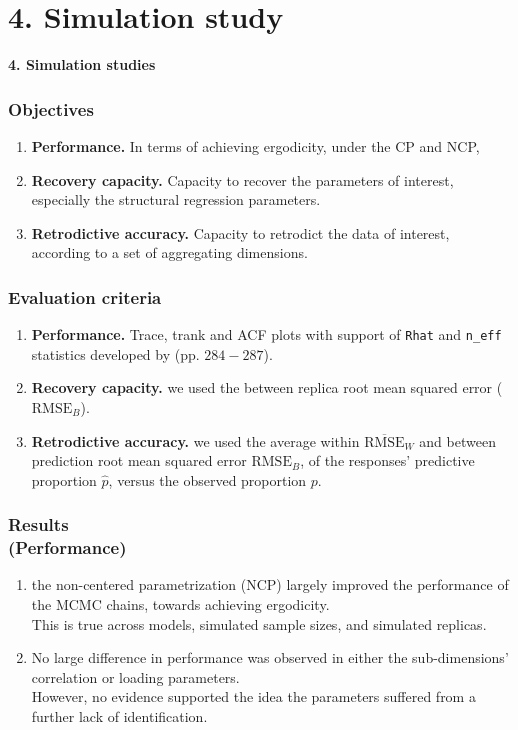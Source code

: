 \documentclass[arial,12pt,xcolor=dvipsnames]{beamer}
\begin{document}
\section{4. Simulation study}
%
\begin{frame}
	\textbf{4. Simulation studies}
\end{frame}
%
\begin{frame}
	\frametitle{Objectives}
	\begin{enumerate}
		\item \textbf{Performance.} In terms of achieving ergodicity, under the CP and NCP, 
		\item \textbf{Recovery capacity.} Capacity to recover the parameters of interest, especially the structural regression parameters.
		\item \textbf{Retrodictive accuracy.} Capacity to retrodict the data of interest, according to a set of aggregating dimensions.
	\end{enumerate} 
\end{frame}
%
\begin{frame}
	\frametitle{Evaluation criteria}
	\begin{enumerate}
		\item \textbf{Performance.} Trace, trank and ACF plots with support of \texttt{Rhat} and \texttt{n\_eff} statistics developed by \citet{Gelman_et_al_2014} (pp. $284-287$).
		\item \textbf{Recovery capacity.} we used the between replica root mean squared error ($\text{RMSE}_{B}$).
		\item \textbf{Retrodictive accuracy.} we used the average within $\overline{\text{RMSE}}_{W}$ and between prediction root mean squared error $\text{RMSE}_{B}$, of the responses' predictive proportion $\hat{p}$, versus the observed proportion $p$.
	\end{enumerate} 
\end{frame}
%
\begin{frame}
	\frametitle{Results \\
		(Performance)}
	\begin{enumerate}
		\item the non-centered parametrization (NCP) largely
		improved the performance of the MCMC chains, towards achieving ergodicity.\\
		\vspace{0.3cm} This is true across models, simulated sample sizes, and simulated replicas.
		\item No large difference in performance was observed in either the sub-dimensions’ correlation or loading parameters.\\
		\vspace{0.3cm} However, no evidence supported the idea the parameters suffered from a further lack of identification.
	\end{enumerate} 
\end{frame}
\end{document}
